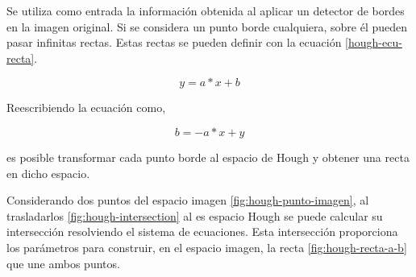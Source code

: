 Se utiliza como entrada la información obtenida al aplicar un detector de bordes en la imagen original. Si se considera un punto borde cualquiera, sobre él pueden pasar infinitas rectas. Estas rectas se pueden definir con la ecuación \ref{hough-ecu-recta}.

\begin{equation}
    \label{hough-ecu-recta}
    y = a*x + b
\end{equation}

Reescribiendo la ecuación como,

\begin{equation}
b = -a*x + y
\end{equation}

es posible transformar cada punto borde al espacio de Hough y obtener una recta en dicho espacio.

Considerando dos puntos del espacio imagen \ref{fig:hough-punto-imagen}, al trasladarlos \ref{fig:hough-intersection} al es espacio Hough se puede calcular su intersección resolviendo el sistema de ecuaciones. Esta intersección proporciona los parámetros para construir, en el espacio imagen, la recta \ref{fig:hough-recta-a-b} que une ambos puntos.

